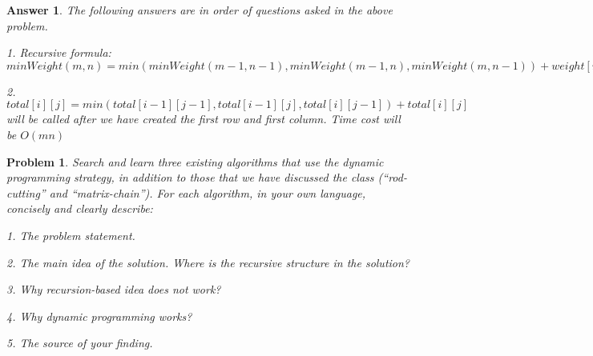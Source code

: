 \documentclass[11pt]{article}
\newtheorem{problem}{Problem}
\newtheorem{answer}{Answer}
\begin{document}
\begin{answer}
\label{ans:3}
The following answers are in order of questions asked in the above problem.

1. Recursive formula: $minWeight(m, n) = min (minWeight(m-1, n-1), minWeight(m-1, n), minWeight(m, n-1)) + weight[m][n]$

2. $total[i][j] = min(total[i-1][j-1], total[i-1][j], total[i][j-1]) + total[i][j]$ will be called after we have created the first row and first column. Time cost will be $O(mn)$
\end{answer}

\bigskip

\begin{problem}
\label{prob:4}
Search and learn three existing algorithms that use the dynamic programming strategy, in addition to those that we have discussed the class (“rod-cutting” and “matrix-chain”). For each algorithm, in your own language, concisely and clearly describe:

1. The problem statement.

2. The main idea of the solution. Where is the recursive structure in the solution?

3. Why recursion-based idea does not work?

4. Why dynamic programming works?

5. The source of your finding.
\end{problem}
\end{document}
